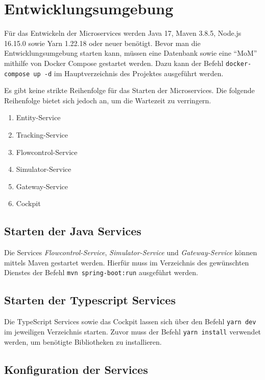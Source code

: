 \section{Entwicklungsumgebung}

Für das Entwickeln der Microservices werden Java 17, Maven 3.8.5, Node.js 16.15.0 sowie Yarn 1.22.18 oder neuer benötigt.
Bevor man die Entwicklungsumgebung starten kann, müssen eine Datenbank sowie eine \enquote{MoM} mithilfe von Docker Compose gestartet werden.
Dazu kann der Befehl \verb|docker-compose up -d| im Hauptverzeichnis des Projektes ausgeführt werden.

Es gibt keine strikte Reihenfolge für das Starten der Microservices.
Die folgende Reihenfolge bietet sich jedoch an, um die Wartezeit zu verringern. 

\begin{enumerate}
	\item Entity-Service
	\item Tracking-Service
	\item Flowcontrol-Service
	\item Simulator-Service
	\item Gateway-Service
	\item Cockpit
\end{enumerate}

\subsection{Starten der Java Services}

Die Services \textit{Flowcontrol-Service}, \textit{Simulator-Service} und \textit{Gateway-Service} können mittels Maven gestartet werden.
Hierfür muss im Verzeichnis des gewünschten Dienstes der Befehl \verb|mvn spring-boot:run| ausgeführt werden.

\subsection{Starten der Typescript Services}

Die TypeScript Services sowie das Cockpit lassen sich über den Befehl \verb|yarn dev| im jeweiligen Verzeichnis starten.
Zuvor muss der Befehl \verb|yarn install| verwendet werden, um benötigte Bibliotheken zu installieren. 


\subsection{Konfiguration der Services}


